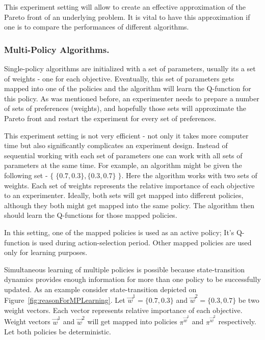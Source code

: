 This experiment setting will allow to create an effective approximation of the Pareto front of an underlying problem. It is vital to have this approximation if one is to compare the performances of different algorithms.

\subsubsection{Multi-Policy Algorithms.}

Single-policy algorithms are initialized with a set of parameters, usually its a set of weights - one for each objective. Eventually, this set of parameters gets mapped into one of the policies and the algorithm will learn the Q-function for this policy. As was mentioned before, an experimenter needs to prepare a number of sets of preferences (weights), and hopefully those sets will approximate the Pareto front and restart the experiment for every set of preferences.

This experiment setting is not very efficient - not only it takes more computer time but also significantly complicates an experiment design. Instead of sequential working with each set of parameters one can work with all sets of parameters at the same time. For example, an algorithm might be given the following set - $ \{\;\{0.7,0.3\}, \{0.3,0.7\}\;\} $. Here the algorithm works with two sets of weights. Each set of weights represents the relative importance of each objective to an experimenter. Ideally, both sets will get mapped into different policies, although they both might get mapped into the same policy.  The algorithm then should learn the Q-functions for those mapped policies.

In this setting, one of the mapped policies is used as an active policy; It's Q-function is used during action-selection period. Other mapped policies are used only for learning purposes.

Simultaneous learning of multiple policies is possible because state-transition dynamics provides enough information for more than one policy to be successfully updated. As an example consider state-transition depicted on Figure~\ref{fig:reasonForMPLearning}. Let $ \vec{w}^{1}=\{0.7,0.3\} $  and $ \vec{w}^{2}=\{0.3,0.7\} $ be two weight vectors. Each vector represents relative importance of each objective. Weight vectors $ \vec{w}^{1} $  and $ \vec{w}^{2} $ will get mapped into policies $ \pi^{\vec{w}^{1}} $  and $ \pi^{\vec{w}^{2}} $ respectively. Let both policies be deterministic.

